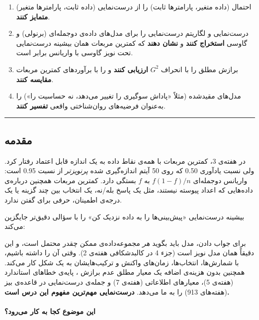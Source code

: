 \begin{enumerate}
\def\labelenumi{\arabic{enumi}.}
\tightlist
\item
  احتمال (داده متغیر، پارامترها ثابت) را از درست‌نمایی (داده ثابت،
  پارامترها متغیر) \textbf{متمایز کنند}.
\item
  درست‌نمایی و لگاریتم درست‌نمایی را برای مدل‌های داده‌ی دوجمله‌ای (برنولی) و
  گاوسی \textbf{استخراج کنند} و \textbf{نشان دهند} که کمترین مربعات همان
  بیشینه درست‌نمایی تحت نویز گاوسی با واریانس برابر است.
\item
  برازش مطلق را با انحراف  \(G^2\) \textbf{ارزیابی کنند}
  و  را با برآوردهای کمترین مربعات \textbf{مقایسه کنند}.
\item
  مدل‌های مقیدشده (مثلاً «پاداش سوگیری را تغییر می‌دهد، نه حساسیت را») را
  به‌عنوان فرضیه‌های روان‌شناختی واقعی \textbf{تفسیر کنند}.
\end{enumerate}

\begin{center}\rule{0.5\linewidth}{0.5pt}\end{center}

\subsection{مقدمه}

در هفته‌ی 3، کمترین مربعات با همه‌ی نقاط داده به یک اندازه قابل اعتماد
رفتار کرد. ولی نسبت یادآوری 0.50 که روی 50 آیتم اندازه‌گیری شده
\emph{پرنویزتر} از نسبت 0.95 است: واریانس دوجمله‌ای \(f(1-f)/n\) به \(f\)
بستگی دارد. کمترین مربعات همچنین درباره‌ی داده‌هایی که اعداد پیوسته
نیستند، مثل یک پاسخ بله/نه، یک انتخاب بین چند گزینه یا یک درجه‌ی اطمینان،
حرفی برای گفتن ندارد.

بیشینه درست‌نمایی «پیش‌بینی‌ها را به داده نزدیک کن» را با سؤالی دقیق‌تر
جایگزین می‌کند:

برای جواب دادن، مدل باید بگوید \emph{هر} مجموعه‌داده‌ی ممکن چقدر محتمل
است، و این دقیقاً همان مدل نویز است (جزء 4 در کالبدشکافی هفته‌ی 2). وقتی
آن را داشته باشیم،  با شمارش‌ها، انتخاب‌ها، زمان‌های واکنش و
ترکیب‌هایشان به یک شکل کار می‌کند. همچنین بدون هزینه‌ی اضافه یک معیار مطلق
عدم برازش ، پایه‌ی خطاهای استاندارد (هفته‌ی 5)، معیارهای
اطلاعاتی (هفته‌ی 7) و جمله‌ی درست‌نمایی در قاعده‌ی بیز (هفته‌های 9\lr{--}13) را به
ما می‌دهد. \textbf{درست‌نمایی مهم‌ترین مفهوم این درس است.}

\paragraph{این موضوع کجا به کار می‌رود؟}


